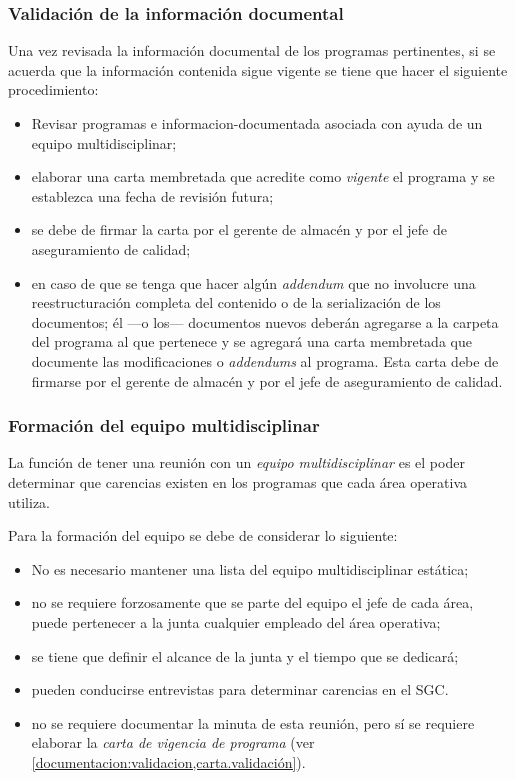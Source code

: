 \subsubsection{Validación de la información documental}
\label{documentacion:validacion}
Una vez revisada la información documental de los programas pertinentes, si se acuerda que la información contenida sigue vigente se tiene que hacer el siguiente procedimiento:
\begin{itemize}
    \item Revisar programas e \gls{informacion-documentada} asociada con ayuda de un equipo multidisciplinar;
    \item elaborar una carta membretada que acredite como \emph{vigente} el programa y se establezca una fecha de revisión futura;
    \item se debe de firmar la carta por el gerente de almacén y por el jefe de aseguramiento de calidad;
    \item en caso de que se tenga que hacer algún \textit{addendum} que no involucre una reestructuración completa del contenido o de la serialización de los documentos; él ---o los--- documentos nuevos deberán agregarse a la carpeta del programa al que pertenece y se agregará una carta membretada que documente las modificaciones o \textit{addendums} al programa. Esta carta debe de firmarse por el gerente de almacén y por el jefe de aseguramiento de calidad.
\end{itemize}

\subsubsection{Formación del equipo multidisciplinar}
\label{documentacion:formacionEquipo}
La función de tener una reunión con un \emph{equipo multidisciplinar} es el poder determinar que carencias existen en los programas que cada área operativa utiliza.

Para la formación del equipo se debe de considerar lo siguiente:
\begin{itemize}
    \item No es necesario mantener una lista del equipo multidisciplinar estática;
    \item no se requiere forzosamente que se parte del equipo el jefe de cada área, puede pertenecer a la junta cualquier empleado del área operativa;
    \item se tiene que definir el alcance de la junta y el tiempo que se dedicará;
    \item pueden conducirse entrevistas para determinar carencias en el SGC.
    \item no se requiere documentar la minuta de esta reunión, pero sí se requiere elaborar la \emph{carta de vigencia de programa} (ver \cref{documentacion:validacion,carta.validación}).
\end{itemize}


